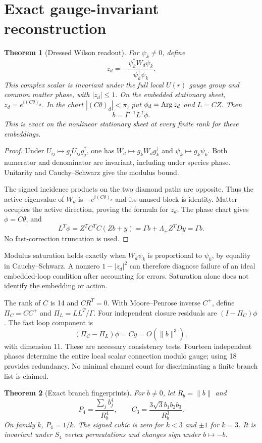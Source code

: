 \documentclass[11pt,a4paper]{article}
\newtheorem{theorem}{Theorem}\newtheorem{proposition}[theorem]{Proposition}
\begin{document}
\section{Exact gauge-invariant reconstruction}
\begin{theorem}[Dressed Wilson readout]\label{th:readout}
For $\psi_k\ne0$, define
\[
z_d=-\frac{\psi_k^\dagger W_d\psi_k}{\psi_k^\dagger\psi_k}.
\]
This complex scalar is invariant under the full local $U(r)$ gauge group and common matter phase, with $|z_d|\le1$. On the embedded stationary sheet, $z_d=e^{i(C\theta)_d}$. In the chart $|(C\theta)_d|<\pi$, put $\phi_d=\operatorname{Arg} z_d$ and $L=CZ$. Then
\begin{equation}\boxed{b=\Gamma^{-1}L^T\phi.}\label{eq:readout}\end{equation}
This is exact on the nonlinear stationary sheet at every finite rank for these embeddings.
\end{theorem}
\begin{proof}
Under $U_{ij}\mapsto g_iU_{ij}g_j^\dagger$, one has $W_d\mapsto g_kW_dg_k^\dagger$ and $\psi_k\mapsto g_k\psi_k$. Both numerator and denominator are invariant, including under species phase. Unitarity and Cauchy--Schwarz give the modulus bound.

The signed incidence products on the two diamond paths are opposite. Thus the active eigenvalue of $W_d$ is $-e^{i(C\theta)_d}$ and its unused block is identity. Matter occupies the active direction, proving the formula for $z_d$. The phase chart gives $\phi=C\theta$, and
\[
L^T\phi=Z^TC^TC(Zb+y)=\Gamma b+\Lambda_+Z^TDy=\Gamma b.
\]
No fast-correction truncation is used.
\end{proof}
Modulus saturation holds exactly when $W_d\psi_k$ is proportional to $\psi_k$, by equality in Cauchy--Schwarz. A nonzero $1-|z_d|^2$ can therefore diagnose failure of an ideal embedded-loop condition after accounting for errors. Saturation alone does not identify the embedding or action.

The rank of $C$ is 14 and $CR^T=0$. With Moore--Penrose inverse $C^+$, define $\Pi_C=CC^+$ and $\Pi_L=LL^T/\Gamma$. Four independent closure residuals are $(I-\Pi_C)\phi$. The fast loop component is
\[
(\Pi_C-\Pi_L)\phi=Cy=O(\|b\|^3),
\]
with dimension 11. These are necessary consistency tests. Fourteen independent phases determine the entire local scalar connection modulo gauge; using 18 provides redundancy. No minimal channel count for discriminating a finite branch list is claimed.

\begin{theorem}[Exact branch fingerprints]
For $b\ne0$, let $R_b=\|b\|$ and
\[
P_4=\frac{\sum_jb_j^4}{R_b^4},\qquad C_3=\frac{3\sqrt3 b_1b_2b_3}{R_b^3}.
\]
On family $k$, $P_4=1/k$. The signed cubic is zero for $k<3$ and $\pm1$ for $k=3$. It is invariant under $S_4$ vertex permutations and changes sign under $b\mapsto-b$.
\end{theorem}
\newpage
\end{document}
